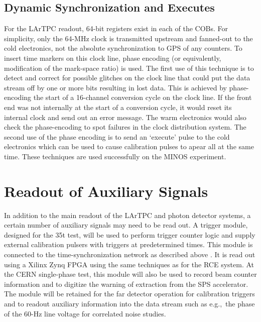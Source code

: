 \subsection{Dynamic Synchronization and Executes}
\label{sec:dyn-sync-exec}
For the LArTPC readout, 64-bit registers exist in each of the COBs.
For simplicity, only the 64-MHz clock is transmitted upstream and
fanned-out to the cold electronics, not the absolute synchronization
to GPS of any counters.  To insert time markers on this clock line,
phase encoding (or equivalently, modification of the mark-space ratio)
is used.  The first use of this technique is to detect and correct for
possible glitches on the clock line that could put the data stream off
by one or more bits resulting in lost data.  This is achieved by phase-encoding the start of a 16-channel conversion cycle on the clock line.
If the front end was not internally at the start of a conversion
cycle, it would reset its internal clock and send out an error
message.  The warm electronics would also check the phase-encoding to
spot failures in the clock distribution system.  The second use of the
phase encoding is to send an `execute' pulse to the cold electronics
which can be used to cause calibration pulses to apear all at the same
time.  These techniques are used successfully on the MINOS experiment.

\section{Readout of Auxiliary Signals}
\label{sec:daq_penn}

In addition to the main readout of the LArTPC and photon detector
systems, a certain number of auxiliary signals may need to be read
out.  A trigger module, designed for the 35t test,  will be
used to perform trigger counter logic and supply external calibration
pulsers with triggers at predetermined times.  This module is
connected to the time-synchronization network as described above .  It
is read out using a Xilinx Zynq FPGA using the same techniques as for
the RCE system.   At the CERN single-phase test, this module will also be used to
record beam counter information and to digitize the warning of
extraction from the SPS accelerator.  The module will be retained for
the far detector operation for calibration triggers and to readout auxiliary information into the
data stream such as e.g.,\ the phase of the 60-Hz line voltage for
correlated noise studies.  

